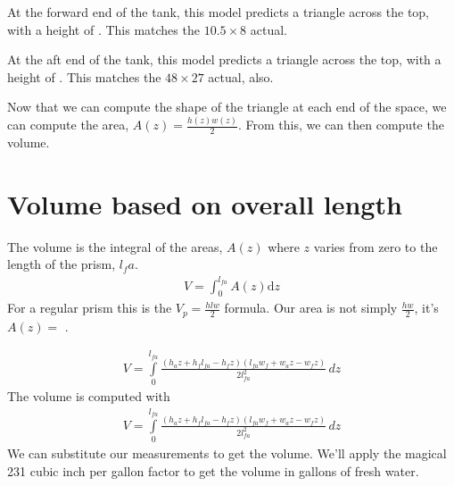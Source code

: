 \documentclass[letterpaper,10pt,english]{sphinxmanual}
\begin{document}
\sphinxAtStartPar
At the forward end of the tank, this model predicts a triangle  across the top,
with a height of . This matches the \(10.5 \times 8\) actual.

\sphinxAtStartPar
At the aft end of the tank, this model predicts a triangle  across the top,
with a height of . This matches the \(48 \times 27\) actual, also.

\sphinxAtStartPar
Now that we can compute the shape of the triangle at each end of the space, we can compute the area, \(A(z) = \frac{h(z) w(z)}{2}\). From this, we can then compute the volume.


\section{Volume based on overall length}
\label{\detokenize{prism-irregular:volume-based-on-overall-length}}
\sphinxAtStartPar
The volume is the integral of the areas, \(A(z)\) where \(z\) varies from zero to the length of the prism, \(l_fa\).
\begin{equation*}
\begin{split}
V = \int_{0}^{l_{fa}} A(z) \text{d}z
\end{split}
\end{equation*}
\sphinxAtStartPar
For a regular prism this is the \(V_p = \frac{h l w}{2}\) formula. Our area is not simply \(\frac{hw}{2}\), it’s \(A(z) = \) .

\begin{sphinxVerbatim}[commandchars=\\\{\}]
     
\end{sphinxVerbatim}
\begin{equation*}
\begin{split}\displaystyle V = \int\limits_{0}^{l_{fa}} \frac{\left(h_{a} z + h_{f} l_{fa} - h_{f} z\right) \left(l_{fa} w_{f} + w_{a} z - w_{f} z\right)}{2 l_{fa}^{2}}\, dz\end{split}
\end{equation*}
\sphinxAtStartPar
The volume is computed with
\begin{equation}\label{equation:index:volume}
\begin{split}\displaystyle V = \int\limits_{0}^{l_{fa}} \frac{\left(h_{a} z + h_{f} l_{fa} - h_{f} z\right) \left(l_{fa} w_{f} + w_{a} z - w_{f} z\right)}{2 l_{fa}^{2}}\, dz\end{split}
\end{equation}
\sphinxAtStartPar
We can substitute our measurements to get the volume. We’ll apply the magical 231 cubic inch per gallon factor to get the volume in gallons of fresh water.
\end{document}
